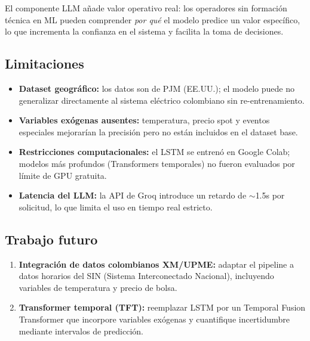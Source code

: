 \documentclass[10pt,twocolumn]{article}
\begin{document}
El componente LLM añade valor operativo real: los operadores
sin formación técnica en ML pueden comprender \textit{por qué}
el modelo predice un valor específico, lo que incrementa
la confianza en el sistema y facilita la toma de decisiones.

\subsection{Limitaciones}

\begin{itemize}[leftmargin=*,topsep=2pt,itemsep=1pt]
  \item \textbf{Dataset geográfico:} los datos son de PJM
    (EE.UU.); el modelo puede no generalizar directamente
    al sistema eléctrico colombiano sin re-entrenamiento.
  \item \textbf{Variables exógenas ausentes:} temperatura,
    precio spot y eventos especiales mejorarían la precisión
    pero no están incluidos en el dataset base.
  \item \textbf{Restricciones computacionales:} el LSTM se
    entrenó en Google Colab; modelos más profundos (Transformers
    temporales) no fueron evaluados por límite de GPU gratuita.
  \item \textbf{Latencia del LLM:} la API de Groq introduce
    un retardo de $\sim$1.5s por solicitud, lo que limita
    el uso en tiempo real estricto.
\end{itemize}

\subsection{Trabajo futuro}

\begin{enumerate}[leftmargin=*,topsep=2pt,itemsep=2pt]
  \item \textbf{Integración de datos colombianos XM/UPME:}
    adaptar el pipeline a datos horarios del SIN (Sistema
    Interconectado Nacional), incluyendo variables de
    temperatura y precio de bolsa.
  \item \textbf{Transformer temporal (TFT):}
    reemplazar LSTM por un Temporal Fusion Transformer
    que incorpore variables exógenas y cuantifique
    incertidumbre mediante intervalos de predicción.
\end{enumerate}

\end{document}
